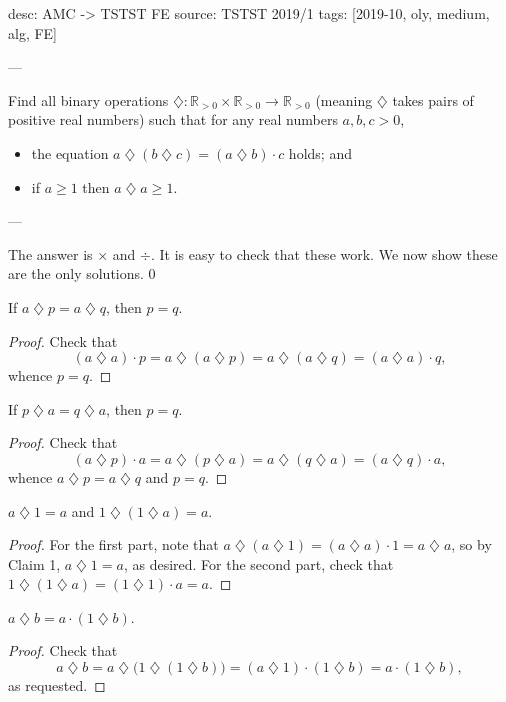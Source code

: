 desc: AMC -> TSTST FE
source: TSTST 2019/1
tags: [2019-10, oly, medium, alg, FE]

---

Find all binary operations $\mathbin{\diamondsuit}:\mathbb R_{>0}\times\mathbb R_{>0}\to\mathbb R_{>0}$ (meaning $\mathbin{\diamondsuit}$ takes pairs of positive real numbers) such that for any real numbers $a,b,c>0$,
\begin{itemize}[itemsep=0em]
    \item the equation $a\mathbin{\diamondsuit}(b\mathbin{\diamondsuit}c)=(a\mathbin{\diamondsuit}b)\cdot c$ holds; and
    \item if $a\ge 1$ then $a\mathbin{\diamondsuit}a\ge 1$.
\end{itemize}

---

The answer is $\times$ and $\div$. It is easy to check that these work. We now show these are the only solutions.
\setcounter{iclaim}0
\begin{iclaim}
    If $a\mathbin{\diamondsuit}p=a\mathbin{\diamondsuit}q$, then $p=q$.
\end{iclaim}
\begin{proof}
    Check that \[(a\mathbin{\diamondsuit}a)\cdot p=a\mathbin{\diamondsuit}(a\mathbin{\diamondsuit}p)=a\mathbin{\diamondsuit}(a\mathbin{\diamondsuit}q)=(a\mathbin{\diamondsuit}a)\cdot q,\]
    whence $p=q$.
\end{proof}
\begin{iclaim}
    If $p\mathbin{\diamondsuit}a=q\mathbin{\diamondsuit}a$, then $p=q$.
\end{iclaim}
\begin{proof}
    Check that \[(a\mathbin{\diamondsuit}p)\cdot a=a\mathbin{\diamondsuit}(p\mathbin{\diamondsuit}a)=a\mathbin{\diamondsuit}(q\mathbin{\diamondsuit}a)=(a\mathbin{\diamondsuit}q)\cdot a,\]
    whence $a\mathbin{\diamondsuit}p=a\mathbin{\diamondsuit}q$ and $p=q$.
\end{proof}
\begin{iclaim}
    $a\mathbin{\diamondsuit}1=a$ and $1\mathbin{\diamondsuit}(1\mathbin{\diamondsuit}a)=a$.
\end{iclaim}
\begin{proof}
    For the first part, note that $a\mathbin{\diamondsuit}(a\mathbin{\diamondsuit}1)=(a\mathbin{\diamondsuit}a)\cdot 1=a\mathbin{\diamondsuit}a$, so by Claim 1, $a\mathbin{\diamondsuit}1=a$, as desired. For the second part, check that $1\mathbin{\diamondsuit}(1\mathbin{\diamondsuit}a)=(1\mathbin{\diamondsuit}1)\cdot a=a$.
\end{proof}
\begin{iclaim}
    $a\mathbin{\diamondsuit}b=a\cdot(1\mathbin{\diamondsuit}b)$.
\end{iclaim}
\begin{proof}
    Check that \[a\mathbin{\diamondsuit}b=a\mathbin{\diamondsuit}\big(1\mathbin{\diamondsuit}(1\mathbin{\diamondsuit}b)\big)=(a\mathbin{\diamondsuit}1)\cdot(1\mathbin{\diamondsuit}b)=a\cdot(1\mathbin{\diamondsuit}b),\]
    as requested.
\end{proof}

